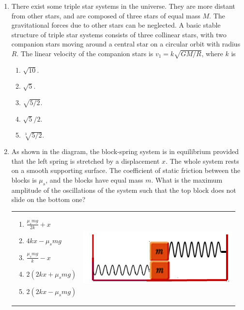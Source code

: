 \documentclass[12pt,letterpaper]{article}
\begin{document}
\begin{enumerate}[resume]
\item
There exist some triple star systems in the universe. They are more distant from other stars, and are composed of three stars of equal mass $M$. The gravitational forces due to other stars can be neglected. A basic stable structure of triple star systems consists of three collinear stars, with two companion stars moving around a central star on a circular orbit with radius $R$. The linear velocity of the companion stars is $v_1 = k\sqrt{GM/R}$, where $k$ is
\begin{enumerate}
\item $\sqrt{10}$.
\item $\sqrt{5}$.
\item $\sqrt{5/2}$.
\item $\sqrt{5}/2$.
\item $\sqrt[3]{5/2}$.
\end{enumerate}

\item
As shown in the diagram, the block-spring system is in equilibrium provided that the left spring is stretched by a displacement $x$. The whole system rests on a smooth supporting surface. The coefficient of static friction between the blocks is $\mu_s$, and the blocks have equal mass $m$. What is the maximum amplitude of the oscillations of the system such that the top block does not slide on the bottom one?

\begin{tabular}{l r}

\begin{minipage}{0.5\textwidth}
\begin{enumerate}
\item $\displaystyle \frac{\mu_s mg}{2k}+x$
\item $4kx-\mu_s mg$
\item $\displaystyle \frac{\mu_s mg}{k}-x$
\item $2(2kx+\mu_s mg)$
\item $2(2kx-\mu_s mg)$
\end{enumerate}
\end{minipage} &
\begin{minipage}{0.4\textwidth}
\includegraphics[width=\textwidth]{spring.png}
\end{minipage}
\end{tabular}


\end{enumerate}
\end{document}

